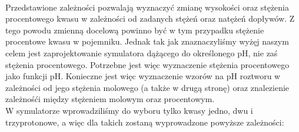 \documentclass[polish,polish,a4paper,12pt]{article}
\begin{document}
	\\
	Przedstawione zależności pozwalają wyznaczyć zmianę wysokości oraz stężenia procentowego kwasu w zależności od zadanych stężeń oraz natężeń dopływów. Z tego powodu zmienną docelową powinno być w tym przypadku stężenie procentowe kwasu w pojemniku. Jednak tak jak znaznaczyliśmy wyżęj naszym celem jest zaprojektowanie symulatora dążącego do określonego pH, nie zaś stężenia procentowego. Potrzebne jest więc wyznaczenie stężenia procentowego jako funkcji pH. Konieczne jest więc wyznaczenie wzorów na pH roztworu w zależności od jego stężenia molowego (a także w drugą stronę) oraz znalezienie zależnośći między stężeniem molowym oraz procentowym.\\
	W symulatorze wprowadziliśmy do wyboru tylko kwasy jedno, dwu i trzyprotonowe, a więc dla takich zostaną wyprowadzone powyższe zależności:
\end{document}
